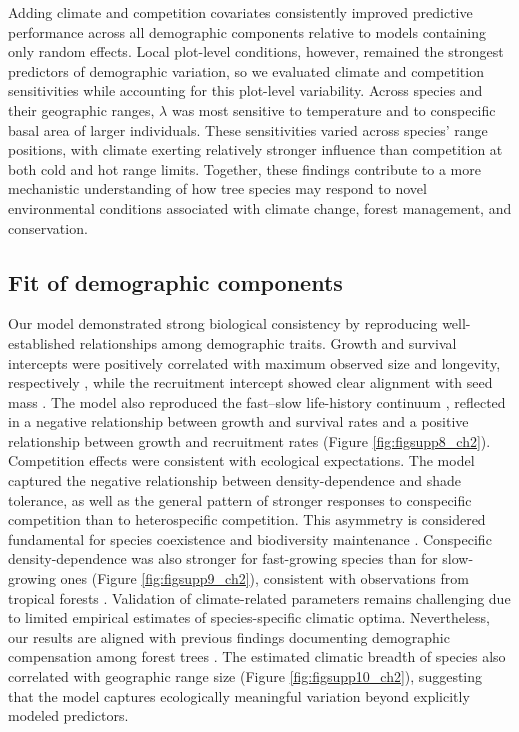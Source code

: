Adding climate and competition covariates consistently improved
predictive performance across all demographic components relative to
models containing only random effects. Local plot-level conditions,
however, remained the strongest predictors of demographic variation, so
we evaluated climate and competition sensitivities while accounting for
this plot-level variability. Across species and their geographic ranges,
\(\lambda\) was most sensitive to temperature and to conspecific basal
area of larger individuals. These sensitivities varied across species'
range positions, with climate exerting relatively stronger influence
than competition at both cold and hot range limits. Together, these
findings contribute to a more mechanistic understanding of how tree
species may respond to novel environmental conditions associated with
climate change, forest management, and conservation.\\

\hypertarget{fit-of-demographic-components}{%
\subsection{Fit of demographic
components}\label{fit-of-demographic-components}}

Our model demonstrated strong biological consistency by reproducing
well-established relationships among demographic traits. Growth and
survival intercepts were positively correlated with maximum observed
size and longevity, respectively \citep{burns1990silvics}, while the
recruitment intercept showed clear alignment with seed mass
\citep{diaz2022}. The model also reproduced the fast--slow life-history
continuum \citep{SalgueroGomez2016}, reflected in a negative
relationship between growth and survival rates and a positive
relationship between growth and recruitment rates (Figure \ref{fig:figsupp8_ch2}).
Competition effects were consistent with ecological expectations. The
model captured the negative relationship between density-dependence and
shade tolerance, as well as the general pattern of stronger responses to
conspecific competition than to heterospecific competition. This
asymmetry is considered fundamental for species coexistence and
biodiversity maintenance \citep{Chesson2000a}. Conspecific
density-dependence was also stronger for fast-growing species than for
slow-growing ones (Figure \ref{fig:figsupp9_ch2}), consistent with observations from
tropical forests \citep{Zhu2018}. Validation of climate-related
parameters remains challenging due to limited empirical estimates of
species-specific climatic optima. Nevertheless, our results are aligned
with previous findings documenting demographic compensation among forest
trees \citep{bohner2020, Yang2022}. The estimated climatic breadth of
species also correlated with geographic range size (Figure \ref{fig:figsupp10_ch2}),
suggesting that the model captures ecologically meaningful variation
beyond explicitly modeled predictors.\\

